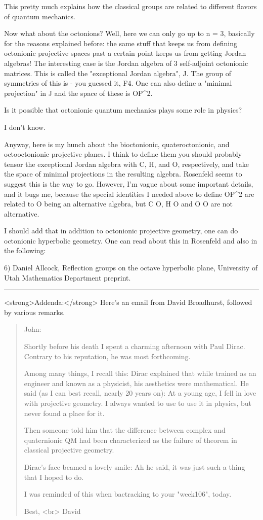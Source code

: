 This pretty much explains
how the classical groups are related to different flavors of quantum
mechanics.

Now what about the octonions?  Well, here we can only go up to n = 3,
basically for the reasons explained before: the same stuff that keeps
us from defining octonionic projective spaces past a certain point
keeps us from getting Jordan algebras!  The interesting case is the
Jordan algebra of 3 self-adjoint octonionic matrices.  This is
called the "exceptional Jordan algebra", J.  The group of symmetries
of this is - you guessed it, F4.  One can also define a "minimal
projection" in J and the space of these is OP^{2}.

Is it possible that octonionic quantum mechanics plays some role in
physics?

I don't know.

Anyway, here is my hunch about the bioctonionic, quateroctonionic, and
octooctonionic projective planes.  I think to define them you should
probably tensor the exceptional Jordan algebra with C, H, and O,
respectively, and take the space of minimal projections in the
resulting algebra.  Rosenfeld seems to suggest this is the way to go.
However, I'm vague about some important details, and it bugs me,
because the special identities I needed above to define OP^{2} are
related to O being an alternative algebra, but C \otimes  O, H \otimes  O
and O \otimes  O are not alternative.

I should add that in addition to octonionic projective geometry, one
can do octonionic hyperbolic geometry.  One can read about this in
Rosenfeld and also in the following:

6) Daniel Allcock, Reflection groups on the octave hyperbolic plane,
University of Utah Mathematics Department preprint.


\par\noindent\rule{\textwidth}{0.4pt}

<strong>Addenda:</strong> Here's an email from David Broadhurst,
followed by various remarks.

\begin{quote}
John:

Shortly before his death I spent a charming afternoon with Paul Dirac.
Contrary to his reputation, he was most forthcoming.

Among many things, I recall this: Dirac explained that while trained
as an engineer and known as a physicist, his aesthetics were mathematical.
He said (as I can best recall, nearly 20 years on): At a young age,
I fell in love with projective geometry.
I always wanted to use to use it in physics, but never found a place for it.

Then someone told him that the difference between complex and quaternionic
QM had been characterized as the failure of theorem in
classical projective geometry.

Dirac's face beamed a lovely smile: Ah he said, it was just such a thing
that I hoped to do.

I was reminded of this when bactracking to your "week106", today.

Best, <br>
David
\end{quote}

